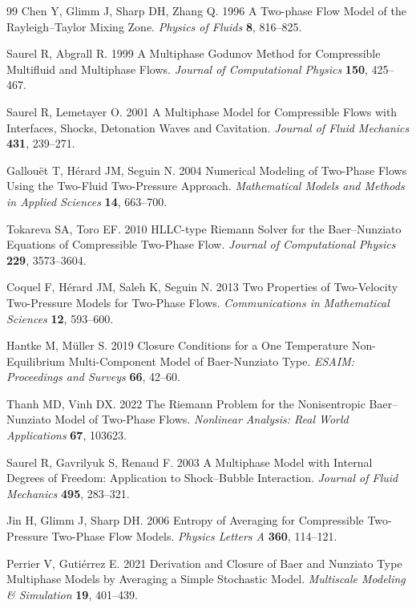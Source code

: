 \documentclass{myclass}
\begin{document}
\begin{thebibliography}{99}
Chen Y, Glimm J, Sharp DH, Zhang Q. 1996  A Two-phase Flow Model of the
  {{Rayleigh}}--{{Taylor}} Mixing Zone. {\em Physics of Fluids} \textbf{8},
  816--825.

Saurel R, Abgrall R. 1999  A {{Multiphase Godunov Method}} for {{Compressible
  Multifluid}} and {{Multiphase Flows}}. {\em Journal of Computational Physics}
  \textbf{150}, 425--467.

Saurel R, Lemetayer O. 2001  A Multiphase Model for Compressible Flows with
  Interfaces, Shocks, Detonation Waves and Cavitation. {\em Journal of Fluid
  Mechanics} \textbf{431}, 239--271.

Gallou{\"e}t T, H{\'e}rard JM, Seguin N. 2004  Numerical {{Modeling}} of
  Two-Phase Flows Using the Two-Fluid Two-Pressure Approach. {\em Mathematical
  Models and Methods in Applied Sciences} \textbf{14}, 663--700.

Tokareva SA, Toro EF. 2010  {{HLLC-type Riemann}} Solver for the
  {{Baer}}--{{Nunziato}} Equations of Compressible Two-Phase Flow. {\em Journal
  of Computational Physics} \textbf{229}, 3573--3604.

Coquel F, H{\'e}rard JM, Saleh K, Seguin N. 2013  Two Properties of
  Two-Velocity Two-Pressure Models for Two-Phase Flows. {\em Communications in
  Mathematical Sciences} \textbf{12}, 593--600.

Hantke M, M{\"u}ller S. 2019  Closure Conditions for a One Temperature
  Non-Equilibrium Multi-Component Model of Baer-Nunziato Type. {\em ESAIM:
  Proceedings and Surveys} \textbf{66}, 42--60.

Thanh MD, Vinh DX. 2022  The {{Riemann}} Problem for the Nonisentropic
  {{Baer}}--{{Nunziato}} Model of Two-Phase Flows. {\em Nonlinear Analysis:
  Real World Applications} \textbf{67}, 103623.

Saurel R, Gavrilyuk S, Renaud F. 2003  A Multiphase Model with Internal Degrees
  of Freedom: Application to Shock--Bubble Interaction. {\em Journal of Fluid
  Mechanics} \textbf{495}, 283--321.

Jin H, Glimm J, Sharp DH. 2006  Entropy of Averaging for Compressible
  Two-Pressure Two-Phase Flow Models. {\em Physics Letters A} \textbf{360},
  114--121.

Perrier V, Guti{\'e}rrez E. 2021  Derivation and {{Closure}} of {{Baer}} and
  {{Nunziato Type Multiphase Models}} by {{Averaging}} a {{Simple Stochastic
  Model}}. {\em Multiscale Modeling \& Simulation} \textbf{19}, 401--439.


\end{thebibliography}
\end{document}
